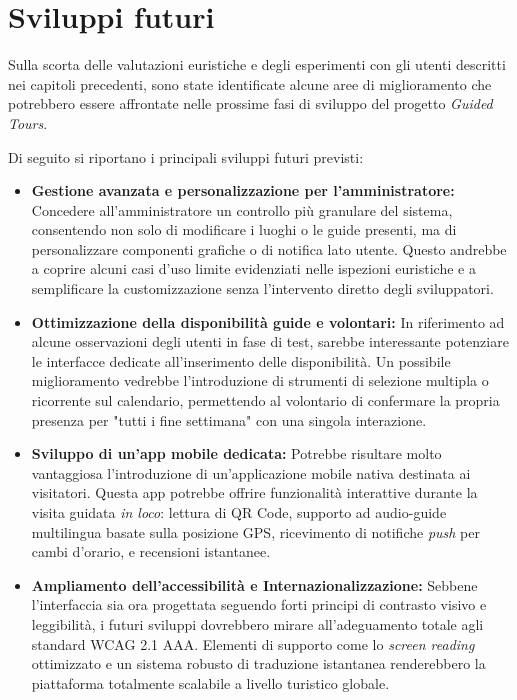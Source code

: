 \chapter{Sviluppi futuri}
\label{ch:sviluppi_futuri}

Sulla scorta delle valutazioni euristiche e degli esperimenti con gli utenti descritti nei capitoli precedenti, sono state identificate alcune aree di miglioramento che potrebbero essere affrontate nelle prossime fasi di sviluppo del progetto \textit{Guided Tours}.

Di seguito si riportano i principali sviluppi futuri previsti:

\begin{itemize}

    \item \textbf{Gestione avanzata e personalizzazione per l'amministratore:} 
    Concedere all'amministratore un controllo più granulare del sistema, consentendo non solo di modificare i luoghi o le guide presenti, ma di personalizzare componenti grafiche o di notifica lato utente. Questo andrebbe a coprire alcuni casi d'uso limite evidenziati nelle ispezioni euristiche e a semplificare la customizzazione senza l'intervento diretto degli sviluppatori.
    
    \item \textbf{Ottimizzazione della disponibilità guide e volontari:}
    In riferimento ad alcune osservazioni degli utenti in fase di test, sarebbe interessante potenziare le interfacce dedicate all'inserimento delle disponibilità. Un possibile miglioramento vedrebbe l'introduzione di strumenti di selezione multipla o ricorrente sul calendario, permettendo al volontario di confermare la propria presenza per "tutti i fine settimana" con una singola interazione.
    
    \item \textbf{Sviluppo di un'app mobile dedicata:}
    Potrebbe risultare molto vantaggiosa l'introduzione di un'applicazione mobile nativa destinata ai visitatori. Questa app potrebbe offrire funzionalità interattive durante la visita guidata \textit{in loco}: lettura di QR Code, supporto ad audio-guide multilingua basate sulla posizione GPS, ricevimento di notifiche \textit{push} per cambi d'orario, e recensioni istantanee.

    \item \textbf{Ampliamento dell'accessibilità e Internazionalizzazione:}
    Sebbene l'interfaccia sia ora progettata seguendo forti principi di contrasto visivo e leggibilità, i futuri sviluppi dovrebbero mirare all'adeguamento totale agli standard WCAG 2.1 AAA. Elementi di supporto come lo \textit{screen reading} ottimizzato e un sistema robusto di traduzione istantanea renderebbero la piattaforma totalmente scalabile a livello turistico globale.
    

\end{itemize}

